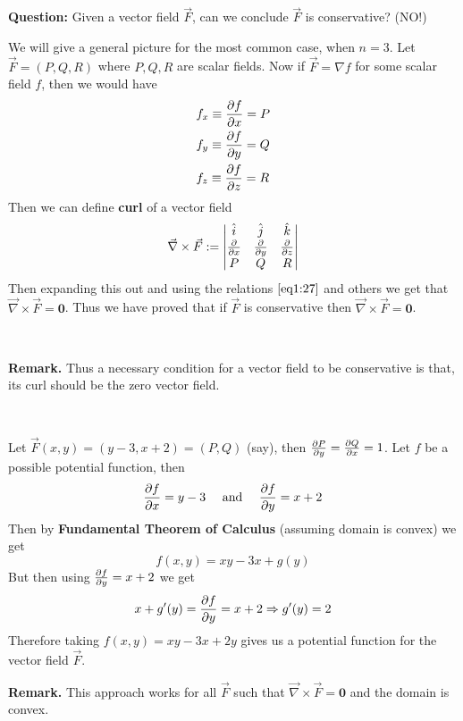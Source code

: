 \documentclass[Analysis-3]{subfiles}
\begin{document}
\textbf{Question:} Given a vector field $\vec{F}$, can we conclude $\vec{F}$ is conservative? (NO!)

We will give a general picture for the most common case, when $n = 3$. Let $\vec{F} = (P,Q,R)$ where $P,Q,R$ are scalar fields. Now if $\vec{F} = \nabla f$ for some scalar field $f$, then we would have 
\begin{align}\label{eq1:27}
    &f_x \equiv \pdv{f}{x} = P \\ 
    &f_y \equiv \pdv{f}{y} = Q \\ 
    &f_z \equiv \pdv{f}{z} = R
\end{align}
Then we can define \textbf{curl} of a vector field 
\[
    \vec{\nabla} \times \vec{F} := \begin{vmatrix}
        \hat{i} & \hat{j} & \hat{k} \\ 
        \pdv{}{x} & \pdv{}{y} & \pdv{}{z} \\ 
        P & Q & R
    \end{vmatrix}    
\]
Then expanding this out and using the relations $\ref{eq1:27}$ and others we get that $\vec{\nabla} \times \vec{F} = \mathbf{0}$. Thus we have proved that if $\vec{F}$ is conservative then $\vec{\nabla} \times \vec{F} = \mathbf{0}$.

\ 

\textbf{Remark.} Thus a necessary condition for a vector field to be conservative is that, its curl should be the zero vector field. 

\ 

\begin{Eg}{}{}
    Let $\vec{F}(x,y) = (y-3,x+2) = (P,Q)$ (say), then $\pdv{P}{y} = \pdv{Q}{x} = 1$. Let $f$ be a possible potential function, then 
    \[
        \pdv{f}{x} = y-3 \quad \mbox{ and } \quad \pdv{f}{y} = x+2     
    \] 
    Then by \textbf{Fundamental Theorem of Calculus} (assuming domain is convex) we get 
    \[
        f(x,y) = xy - 3x + g(y)    
    \] 
    But then using $\pdv{f}{y} = x+2$ we get 
    \[
        x + g'(y) = \pdv{f}{y} = x+2 \Rightarrow g'(y) = 2     
    \]
    Therefore taking $f(x,y) = xy - 3x + 2y$ gives us a potential function for the vector field $\vec{F}$. 
\end{Eg}


\textbf{Remark.} This approach works for all $\vec{F}$ such that $\vec{\nabla} \times \vec{F} = \mathbf{0}$ and the domain is convex.   
\end{document}
